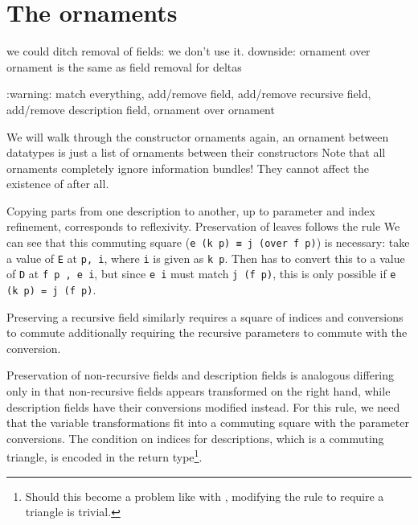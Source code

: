 \section{The ornaments}
\begin{outline}    
we could ditch removal of fields: we don't use it. downside: ornament over ornament is the same as field removal for deltas

:warning: match everything, add/remove field, add/remove recursive field, add/remove description field, ornament over ornament
\end{outline}
    



We will walk through the constructor ornaments
again, an ornament between datatypes is just a list of ornaments between their constructors
Note that all ornaments completely ignore information bundles! They cannot affect the existence of  after all.

Copying parts from one description to another, up to parameter and index refinement, corresponds to reflexivity. Preservation of leaves follows the rule
We can see that this commuting square (\texttt{e (k p) ≡ j (over f p)}) is necessary: take a value of \texttt{E} at \texttt{p, i}, where \texttt{i} is given as \texttt{k p}. Then  has to convert this to a value of \texttt{D} at \texttt{f p , e i}, but since \texttt{e i} must match \texttt{j (f p)}, this is only possible if \texttt{e (k p) = j (f p)}.

Preserving a recursive field similarly requires a square of indices and conversions to commute
additionally requiring the recursive parameters to commute with the conversion. 

Preservation of non-recursive fields and description fields is analogous
differing only in that non-recursive fields appears transformed on the right hand, while description fields have their conversions modified instead. For this rule, we need that the variable transformations fit into a commuting square with the parameter conversions. The condition on indices for descriptions, which is a commuting triangle, is encoded in the return type\footnote{Should this become a problem like with , modifying the rule to require a triangle is trivial.}.

